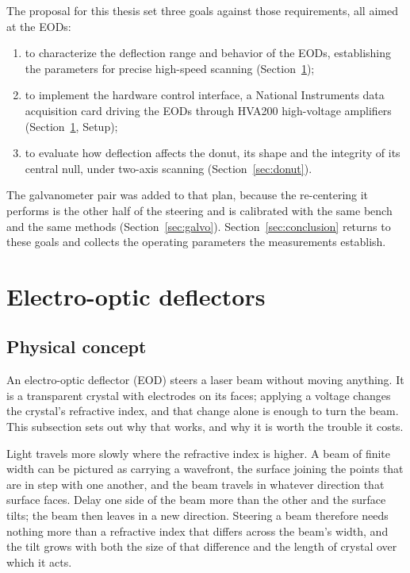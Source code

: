 \documentclass{article}
\begin{document}
The proposal for this thesis set three goals against those requirements, all aimed at the
EODs:
\begin{enumerate}
    \item to characterize the deflection range and behavior of the EODs, establishing the
        parameters for precise high-speed scanning (Section~\ref{sec:eod});
    \item to implement the hardware control interface, a National Instruments data acquisition card
        driving the EODs through HVA200 high-voltage amplifiers (Section~\ref{sec:eod},
        Setup);
    \item to evaluate how deflection affects the donut, its shape and the integrity of its central
        null, under two-axis scanning (Section~\ref{sec:donut}).
\end{enumerate}
The galvanometer pair was added to that plan, because the re-centering it performs is the other half
of the steering and is calibrated with the same bench and the same methods
(Section~\ref{sec:galvo}). Section~\ref{sec:conclusion} returns to these goals and collects the
operating parameters the measurements establish.
\section{Electro-optic deflectors}
\label{sec:eod}
\subsection{Physical concept}

An electro-optic deflector (EOD) steers a laser beam without moving anything. It is a transparent
crystal with electrodes on its faces; applying a voltage changes the crystal's refractive index,
and that change alone is enough to turn the beam. This subsection sets out why that works, and
why it is worth the trouble it costs.

Light travels more slowly where the refractive index is higher. A beam of finite width can be
pictured as carrying a wavefront, the surface joining the points that are in step with one
another, and the beam travels in whatever direction that surface faces. Delay one side of the
beam more than the other and the surface tilts; the beam then leaves in a new direction.
Steering a beam therefore needs nothing more than a refractive index that differs across the
beam's width, and the tilt grows with both the size of that difference and the length of crystal
over which it acts.
\end{document}

